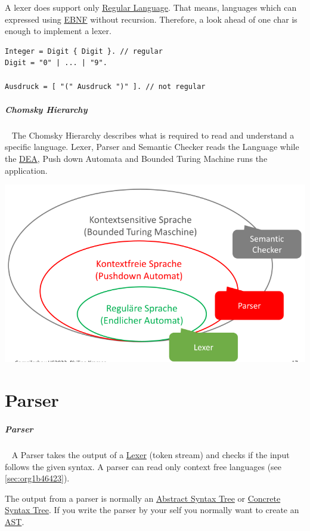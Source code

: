 \documentclass[11pt,twoside,landscape]{article}
\begin{document}
\begin{multicols}{3}
A lexer does support only \href{../../../roam/20221228124714-regular_language.org}{Regular Language}.
That means, languages which can expressed using \href{../../../roam/20221228120443-how_do_you_specify_the_syntax_of_a_language.org}{EBNF} without recursion.
Therefore, a look ahead of one char is enough to implement a lexer.

\begin{verbatim}
Integer = Digit { Digit }. // regular
Digit = "0" | ... | "9".

Ausdruck = [ "(" Ausdruck ")" ]. // not regular
\end{verbatim}
\subparagraph{Chomsky Hierarchy} \
\label{sec:org1b46423}
The Chomsky Hierarchy describes what is required to read and understand a specific language.
Lexer, Parser and Semantic Checker reads the Language while the \href{../../../roam/20211109182310-deterministic_finite_automaton.org}{DEA}, Push down Automata and Bounded Turing Machine runs the application.

{
\begin{center}
\includegraphics[width=.9\linewidth]{img/chomsky_hierarchie.png}
\end{center}
\label{fig:chomsky-hierarchy}
}

\section{Parser}
\label{sec:orgaf0054b}
\subparagraph{Parser} \
\label{sec:org38a1375}
A Parser takes the output of a \href{../../../roam/20221228115248-what_is_a_lexer.org}{Lexer} (token stream) and checks if the input follows the given syntax.
A parser can read only context free languages (see \ref{sec:org1b46423}).

The output from a parser is normally an \href{../../../roam/20221228141024-what_is_a_abstract_syntax_tree.org}{Abstract Syntax Tree} or \href{../../../roam/20221228140533-what_is_a_parse_tree.org}{Concrete Syntax Tree}.
If you write the parser by your self you normally want to create an \href{../../../roam/20221228141024-what_is_a_abstract_syntax_tree.org}{AST}.


\end{multicols}
\end{document}
